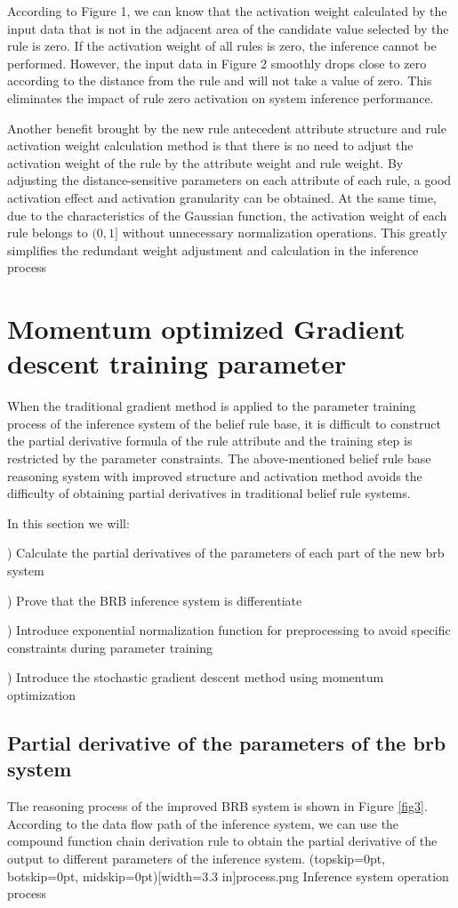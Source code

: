 \documentclass{ieeeaccess}
\begin{document}
According to Figure 1, we can know that the activation weight calculated by the input data that is not in the adjacent area of the candidate value selected by the rule is zero.
If the activation weight of all rules is zero, the inference cannot be performed.
However, the input data in Figure 2 smoothly drops close to zero according to the distance from the rule and will not take a value of zero.
This eliminates the impact of rule zero activation on system inference performance.

Another benefit brought by the new rule antecedent attribute structure and rule activation weight calculation method is that
there is no need to adjust the activation weight of the rule by the attribute weight and rule weight.
By adjusting the distance-sensitive parameters on each attribute of each rule, a good activation effect and activation granularity can be obtained.
At the same time, due to the characteristics of the Gaussian function, the activation weight of each rule belongs to $(0, 1]$ without unnecessary normalization operations.
This greatly simplifies the redundant weight adjustment and calculation in the inference process


\section{Momentum optimized Gradient descent training parameter}
When the traditional gradient method is applied to the parameter training process of the inference system of the belief rule base,
it is difficult to construct the partial derivative formula of the rule attribute and the training step is restricted by the parameter constraints.
The above-mentioned belief rule base reasoning system with improved structure and activation method avoids the difficulty of obtaining partial derivatives in traditional belief rule systems.

In this section we will:

) Calculate the partial derivatives of the parameters of each part of the new brb system

) Prove that the BRB inference system is differentiate

) Introduce exponential normalization function for preprocessing to avoid specific constraints during parameter training

) Introduce the stochastic gradient descent method using momentum optimization


\subsection{Partial derivative of the parameters of the brb system}
The reasoning process of the improved BRB system is shown in Figure \ref{fig3}.
According to the data flow path of the inference system, we can use the compound function chain derivation rule to obtain the partial derivative of the output to different parameters of the inference system.
\Figure[!t](topskip=0pt, botskip=0pt, midskip=0pt)[width=3.3 in]{process.png}
{Inference system operation process\label{fig3}}
\end{document}
